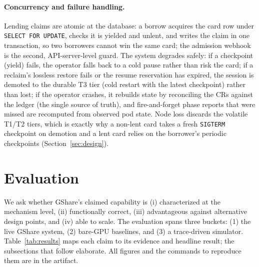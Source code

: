 \documentclass[preprint,12pt]{elsarticle}
\begin{document}
\paragraph{Concurrency and failure handling.}
Lending claims are atomic at the database: a borrow acquires the card row under \texttt{SELECT~FOR
UPDATE}, checks it is \textsf{yielded} and unlent, and writes the claim in one transaction, so two
borrowers cannot win the same card; the admission webhook is the second, API-server-level guard. The
system degrades safely: if a checkpoint (yield) fails, the operator falls back to a cold pause rather than
risk the card; if a reclaim's lossless restore fails or the resume reservation has expired, the session is
demoted to the durable T3 tier (cold restart with the latest checkpoint) rather than lost; if the operator
crashes, it rebuilds state by reconciling the CRs against the ledger (the single source of truth), and
fire-and-forget phase reports that were missed are recomputed from observed pod state. Node loss discards
the volatile T1/T2 tiers, which is exactly why a non-lent card takes a fresh \texttt{SIGTERM} checkpoint on
demotion and a lent card relies on the borrower's periodic checkpoints (Section~\ref{sec:design}).

\section{Evaluation}
\label{sec:eval}

We ask whether GShare's claimed capability is (i) characterized at the mechanism level, (ii)
functionally correct, (iii) advantageous against alternative design points, and (iv) able to scale. The
evaluation spans three buckets: (1) the live GShare system, (2) bare-GPU baselines, and (3) a
trace-driven simulator. Table~\ref{tab:results} maps each claim to its evidence and headline result;
the subsections that follow elaborate. All figures and the commands to reproduce them are in the artifact.
\end{document}
